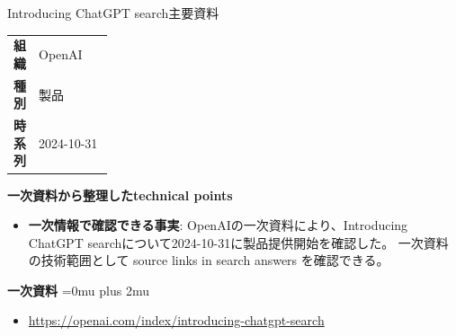 \begin{technicalnote}{Introducing ChatGPT search}{主要資料}
\begingroup
\begin{tabularx}{\linewidth}{@{}>{\bfseries}p{0.22\linewidth}X@{}}
組織 & OpenAI \\
種別 & 製品 \\
時系列 & 2024-10-31 \\
\end{tabularx}
\smallskip
{\bfseries 一次資料から整理したtechnical points}
\begin{itemize}[leftmargin=1.5em,itemsep=0.35em]
\item \textbf{一次情報で確認できる事実}: OpenAIの一次資料により、Introducing ChatGPT searchについて2024-10-31に製品提供開始を確認した。 一次資料の技術範囲として source links in search answers を確認できる。
\end{itemize}
\begin{minipage}{\linewidth}
\begin{samepage}
{\bfseries 一次資料}
\begingroup\sloppy
\Urlmuskip=0mu plus 2mu\relax
\begin{itemize}[leftmargin=1.5em,itemsep=0.25em]
\item {\scriptsize\url{https://openai.com/index/introducing-chatgpt-search}}
\end{itemize}
\endgroup
\end{samepage}
\end{minipage}
\endgroup
\end{technicalnote}
\medskip

